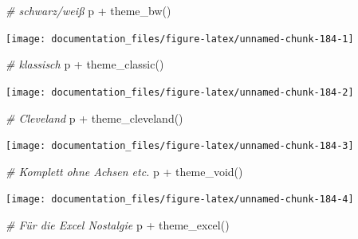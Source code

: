\documentclass[
]{article}
\newenvironment{Shaded}{\begin{snugshade}}{\end{snugshade}}
\newcommand{\CommentTok}[1]{\textcolor[rgb]{0.56,0.35,0.01}{\textit{#1}}}
\newcommand{\FunctionTok}[1]{\textcolor[rgb]{0.00,0.00,0.00}{#1}}
\newcommand{\NormalTok}[1]{#1}
\newcommand{\SpecialCharTok}[1]{\textcolor[rgb]{0.00,0.00,0.00}{#1}}
\begin{document}
\begin{Shaded}
\begin{Highlighting}[]
\CommentTok{\# schwarz/weiß}
\NormalTok{p }\SpecialCharTok{+} \FunctionTok{theme\_bw}\NormalTok{()}
\end{Highlighting}
\end{Shaded}

\begin{center}\texttt{[image: documentation\_files/figure-latex/unnamed-chunk-184-1]} \end{center}

\begin{Shaded}
\begin{Highlighting}[]
\CommentTok{\# klassisch}
\NormalTok{p }\SpecialCharTok{+} \FunctionTok{theme\_classic}\NormalTok{()}
\end{Highlighting}
\end{Shaded}

\begin{center}\texttt{[image: documentation\_files/figure-latex/unnamed-chunk-184-2]} \end{center}

\begin{Shaded}
\begin{Highlighting}[]
\CommentTok{\# Cleveland}
\NormalTok{p }\SpecialCharTok{+} \FunctionTok{theme\_cleveland}\NormalTok{()}
\end{Highlighting}
\end{Shaded}

\begin{center}\texttt{[image: documentation\_files/figure-latex/unnamed-chunk-184-3]} \end{center}

\begin{Shaded}
\begin{Highlighting}[]
\CommentTok{\# Komplett ohne Achsen etc. }
\NormalTok{p }\SpecialCharTok{+} \FunctionTok{theme\_void}\NormalTok{()}
\end{Highlighting}
\end{Shaded}

\begin{center}\texttt{[image: documentation\_files/figure-latex/unnamed-chunk-184-4]} \end{center}

\begin{Shaded}
\begin{Highlighting}[]
\CommentTok{\# Für die Excel Nostalgie}
\NormalTok{p }\SpecialCharTok{+} \FunctionTok{theme\_excel}\NormalTok{()}
\end{Highlighting}
\end{Shaded}
\end{document}
